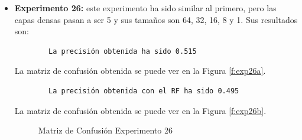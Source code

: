 \begin{itemize}
    \item \textbf{Experimento 26:} este experimento ha sido similar al primero, pero las capas densas pasan a ser 5 y sus tamaños son 64, 32, 16, 8 y 1. Sus resultados son:
    \begin{verbatim}
        La precisión obtenida ha sido 0.515
    \end{verbatim}
    La matriz de confusión obtenida se puede ver en la Figura \ref{f:exp26a}.
    \begin{verbatim}
        La precisión obtenida con el RF ha sido 0.495
    \end{verbatim}
    La matriz de confusión obtenida se puede ver en la Figura \ref{f:exp26b}.
    \begin{figure}[h]
     \centering
     \caption{Matriz de Confusión Experimento 26}
     \label{f:exp26}
    \end{figure}    
    

\end{itemize}
